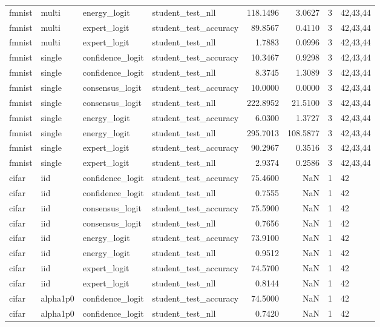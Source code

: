 \begin{tabular}{llllrrrl}
fmnist & multi & energy\_logit & student\_test\_nll & 118.1496 & 3.0627 & 3 & 42,43,44 \\
fmnist & multi & expert\_logit & student\_test\_accuracy & 89.8567 & 0.4110 & 3 & 42,43,44 \\
fmnist & multi & expert\_logit & student\_test\_nll & 1.7883 & 0.0996 & 3 & 42,43,44 \\
fmnist & single & confidence\_logit & student\_test\_accuracy & 10.3467 & 0.9298 & 3 & 42,43,44 \\
fmnist & single & confidence\_logit & student\_test\_nll & 8.3745 & 1.3089 & 3 & 42,43,44 \\
fmnist & single & consensus\_logit & student\_test\_accuracy & 10.0000 & 0.0000 & 3 & 42,43,44 \\
fmnist & single & consensus\_logit & student\_test\_nll & 222.8952 & 21.5100 & 3 & 42,43,44 \\
fmnist & single & energy\_logit & student\_test\_accuracy & 6.0300 & 1.3727 & 3 & 42,43,44 \\
fmnist & single & energy\_logit & student\_test\_nll & 295.7013 & 108.5877 & 3 & 42,43,44 \\
fmnist & single & expert\_logit & student\_test\_accuracy & 90.2967 & 0.3516 & 3 & 42,43,44 \\
fmnist & single & expert\_logit & student\_test\_nll & 2.9374 & 0.2586 & 3 & 42,43,44 \\
cifar & iid & confidence\_logit & student\_test\_accuracy & 75.4600 & NaN & 1 & 42 \\
cifar & iid & confidence\_logit & student\_test\_nll & 0.7555 & NaN & 1 & 42 \\
cifar & iid & consensus\_logit & student\_test\_accuracy & 75.5900 & NaN & 1 & 42 \\
cifar & iid & consensus\_logit & student\_test\_nll & 0.7656 & NaN & 1 & 42 \\
cifar & iid & energy\_logit & student\_test\_accuracy & 73.9100 & NaN & 1 & 42 \\
cifar & iid & energy\_logit & student\_test\_nll & 0.9512 & NaN & 1 & 42 \\
cifar & iid & expert\_logit & student\_test\_accuracy & 74.5700 & NaN & 1 & 42 \\
cifar & iid & expert\_logit & student\_test\_nll & 0.8144 & NaN & 1 & 42 \\
cifar & alpha1p0 & confidence\_logit & student\_test\_accuracy & 74.5000 & NaN & 1 & 42 \\
cifar & alpha1p0 & confidence\_logit & student\_test\_nll & 0.7420 & NaN & 1 & 42 \\

\end{tabular}
